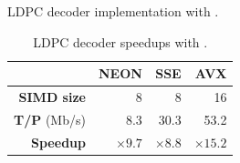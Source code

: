 
\begin{listing}[htp]
  \inputminted[frame=lines,linenos]{C++}{main/chapter3/src/ldpc/bp_min_sum_simd.cpp}
  \caption{LDPC decoder implementation with \MIPP.}
  \label{lst:vec_ldpc_bp_min_sum_simd}
\end{listing}

\begin{table}[htp]
  \centering
  \caption{LDPC decoder speedups with \MIPP.}
  \label{tab:vec_ldpc_speedup}
  \begin{tabular}{r| r r r}
                      & \textbf{NEON} & \textbf{SSE} & \textbf{AVX}  \\ \hline \hline
  \textbf{SIMD size}  & 8             & 8            & 16            \\ %
  \textbf{T/P} (Mb/s) & 8.3           & 30.3         & 53.2          \\ %
  \textbf{Speedup}    & $\times 9.7$  & $\times 8.8$ & $\times 15.2$ \\
  \end{tabular}
\end{table}

